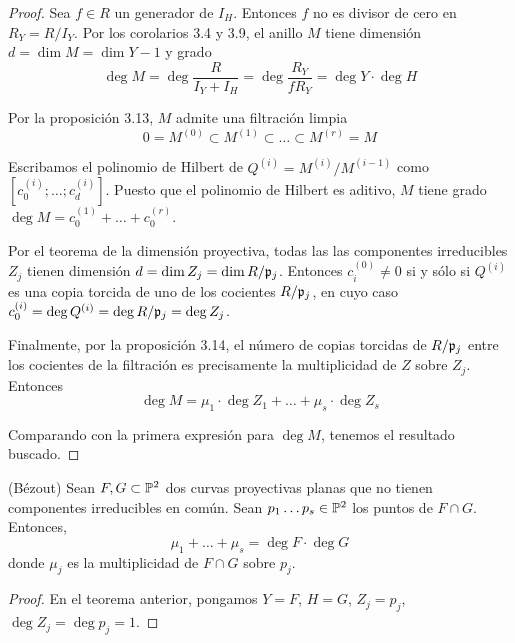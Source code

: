 \begin{proof}
Sea $f \in R$ un generador de $I_H$. Entonces $f$ no es divisor de cero en $R_Y = R/I_Y$. Por los corolarios 3.4 y 3.9, el anillo $M$ tiene dimensión $d = \dim M = \dim Y - 1$ y grado
$$\deg M = \deg \frac R {I_Y + I_H} = \deg \frac {R_Y} {f R_Y} = \deg Y \cdot \deg H$$

Por la proposición 3.13, $M$ admite una filtración limpia
$$0 = M^{(0)} \subset M^{(1)} \subset \dots \subset M^{(r)} = M$$

Escribamos el polinomio de Hilbert de $Q^{(i)} = M^{(i)} / M^{(i-1)}$ como $[c_0^{(i)}; \dots; c_d^{(i)}]$. Puesto que el polinomio de Hilbert es aditivo, $M$ tiene grado $\deg M = c_0^{(1)} + \dots + c_0^{(r)}$.

Por el teorema de la dimensión proyectiva, todas las las componentes irreducibles $Z_j$ tienen dimensión $d = \dim Z_j = \dim R/\p_j$. Entonces $c_i^{(0)} \ne 0$ si y sólo si $Q^{(i)}$ es una copia torcida de uno de los cocientes $R/\p_j$, en cuyo caso $c_0^{(i)} = \deg Q^{(i)} = \deg R/\p_j = \deg Z_j$.

Finalmente, por la proposición 3.14, el número de copias torcidas de $R/\p_j$ entre los cocientes de la filtración es precisamente la multiplicidad de $Z$ sobre $Z_j$. Entonces
$$\deg M = \mu_1 \cdot \deg Z_1 + \dots + \mu_s \cdot \deg Z_s$$

Comparando con la primera expresión para $\deg M$, tenemos el resultado buscado.
\end{proof}

\begin{corollary}
(Bézout) Sean $F, G \subset \P^2$ dos curvas proyectivas planas que no tienen componentes irreducibles en común. Sean $p_1 \dots p_s \in \P^2$ los puntos de $F \cap G$. Entonces,
$$\mu_1 + \dots + \mu_s = \deg F \cdot \deg G$$
donde $\mu_j$ es la multiplicidad de $F \cap G$ sobre $p_j$.
\end{corollary}

\begin{proof}
En el teorema anterior, pongamos $Y = F$, $H = G$, $Z_j = p_j$, $\deg Z_j = \deg p_j = 1$.
\end{proof}
